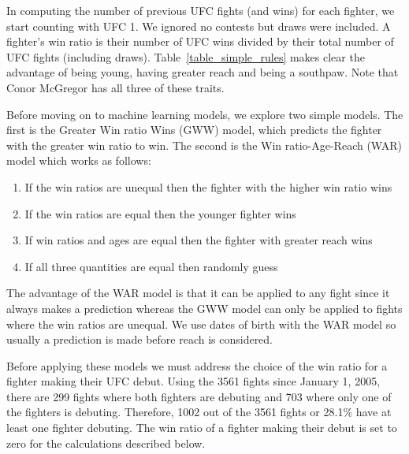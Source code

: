 In computing the number of previous UFC fights (and wins) for each fighter, we start
counting with UFC 1. We ignored no contests but draws were included. A fighter's
win ratio is their number of UFC wins divided by their
total number of UFC fights (including draws).
Table~\ref{table_simple_rules} makes clear the advantage of being young, having
greater reach and being a southpaw. Note that Conor McGregor has all three of
these traits.

Before moving on to machine learning models, we explore two simple
models. The first is the Greater Win ratio Wins (GWW) model,
which predicts the fighter with the greater win ratio to win. The
second is the Win ratio-Age-Reach (WAR) model which works as follows:

\begin{enumerate}[noitemsep]
\item If the win ratios are unequal then the fighter with the higher win ratio wins
\item If the win ratios are equal then the younger fighter wins
\item If win ratios and ages are equal then the fighter with greater reach wins
\item If all three quantities are equal then randomly guess
\end{enumerate}

\noindent
The advantage of the WAR model is that it can be applied to any fight
since it always makes a prediction whereas the GWW model can only be applied
to fights where the win ratios are unequal. We use dates of birth with the
WAR model so usually a prediction is made before reach is considered.

Before applying these models we must address the choice of the win
ratio for a fighter making their UFC debut.
Using the 3561 fights since January 1, 2005, there are
299 fights where both fighters are debuting and 703 where only one
of the fighters is debuting. Therefore, 1002 out of the 3561 fights or
28.1\% have at least one fighter debuting.
The win ratio of a fighter making their debut is
set to zero for the calculations described below.


